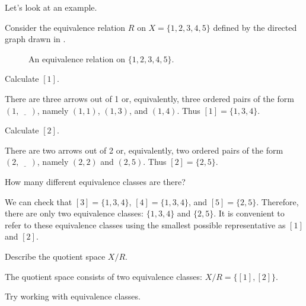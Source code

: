 Let's look at an example.

\begin{exam}
\label{exam_equiv_classes_12345}
    Consider the equivalence relation $R$ on $X = \{1,2,3,4,5\}$ defined by the directed graph drawn in .
        \begin{figure}[hbtp]
            \centering
            
            \caption{An equivalence relation on $\{1,2,3,4,5\}$.}
            \label{fig_equiv_rel_12345}
        \end{figure}
        \begin{apart}
            \item Calculate $[1]$.
                \begin{soln}
                    There are three arrows out of 1 or, equivalently, three ordered pairs of the form $(1,\underline{\quad~})$, namely $(1,1)$, $(1,3)$, and $(1,4)$.  Thus $[1]=\{1,3,4\}$.
                \end{soln}
            \item Calculate $[2]$.
                \begin{soln}
                    There are two arrows out of 2 or, equivalently, two ordered pairs of the form $(2,\underline{\quad~})$, namely $(2,2)$ and $(2,5)$.  Thus $[2]=\{2,5\}$.
                \end{soln}    
            \item How many different equivalence classes are there?
                \begin{soln}
                    We can check that $[3]=\{1,3,4\}$, $[4]=\{1,3,4\}$, and $[5]=\{2,5\}$.  Therefore, there are only two equivalence classes:  $\{1,3,4\}$ and $\{2,5\}$. It is convenient to refer to these equivalence classes using the smallest possible representative as $[1]$ and $[2]$. 
                \end{soln}
            \item Describe the quotient space $X/R$.
                \begin{soln}
                    The quotient space consists of two equivalence classes:  $X/R=\{[1],[2]\}$.  
                \end{soln}
        \end{apart}
\end{exam}

Try working with equivalence classes.

